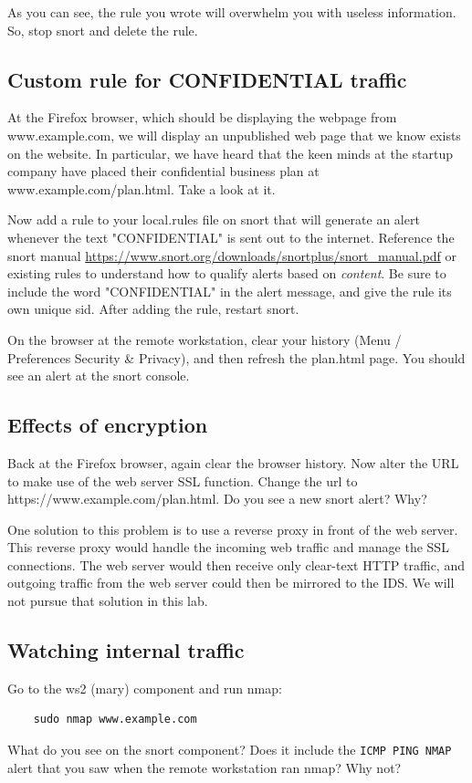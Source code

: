 As you can see, the rule you wrote will overwhelm you with useless information.  So,
stop snort and delete the rule.

\subsection{Custom rule for CONFIDENTIAL traffic}
At the Firefox browser, which should be displaying the webpage from www.example.com,
we will display an unpublished web page that we know exists on the website.  In particular,
we have heard that the keen minds at the startup company have placed their confidential 
business plan at www.example.com/plan.html.  Take a look at it.

Now add a rule to your local.rules file on snort that will generate an alert 
whenever the text "CONFIDENTIAL" is sent out to the internet.  Reference 
the snort manual \url{https://www.snort.org/downloads/snortplus/snort_manual.pdf}
or existing rules to understand how to qualify alerts based on \textit{content}.  Be sure to include the
word "CONFIDENTIAL" in the alert message, and give the
rule its own unique sid.  After adding the rule, restart snort.

On the browser at the remote workstation, clear your history (Menu / Preferences 
Security \& Privacy), and then refresh the plan.html page.  You should see an alert at
the snort console.

\subsection{Effects of encryption}
Back at the Firefox browser, again clear the browser history. Now alter the URL to make
use of the web server SSL function.  Change the url to https://www.example.com/plan.html.
Do you see a new snort alert?  Why?

One solution to this problem is to use a reverse proxy in front of the web server.  This
reverse proxy would handle the incoming web traffic and manage the SSL connections.
The web server would then receive only clear-text HTTP traffic, and outgoing traffic from the web server
could then be mirrored to the IDS.  We will not pursue that solution in this lab.

\subsection{Watching internal traffic}
Go to the ws2 (mary) component and run nmap:
\begin{verbatim}
    sudo nmap www.example.com
\end{verbatim}
What do you see on the snort component?  Does it include the {\tt ICMP PING NMAP}
alert that you saw when the remote workstation ran nmap?  Why not?

